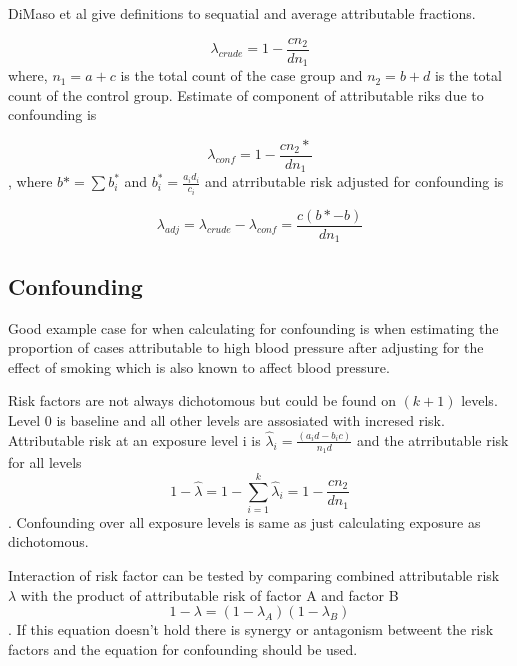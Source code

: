 DiMaso et al give definitions to sequatial and average attributable fractions. 


\begin{equation}
    \lambda_{crude} = 1 - \frac{cn_2}{dn_1}
\end{equation} where, $n_1 = a+c$ is the total count of the case group and $n_2 =  b + d $ is the total count of the control group. Estimate of component of attributable riks due to confounding is\cite{Walter1976TheEA}

\begin{equation}
    \lambda_{conf} = 1 - \frac{cn_2*}{dn_1}
\end{equation}, where $b* = \sum b_i^*$ and $b_i^* = \frac{a_id_i}{c_i}$
and atrributable risk adjusted for confounding is\cite{Walter1976TheEA}

\begin{equation}
    \lambda_{adj} = \lambda_{crude} - \lambda_{conf} = \frac{c(b*-b)}{dn_1}
\end{equation}\cite{Walter1976TheEA}

\subsection{Confounding}
Good example case for when calculating for confounding is when estimating the proportion of cases attributable to high blood pressure after adjusting for the effect of smoking which is also known to affect blood pressure.\cite{Walter1976TheEA}

Risk factors are not always dichotomous but could be found on $(k + 1)$ levels. Level 0 is baseline and all other levels are assosiated with incresed risk. Attributable risk at an exposure level i is $\hat{\lambda}_i = \frac{(a_id - b_ic)}{n_1d}$ and the atrributable risk for all levels
\begin{equation}
    1 - \hat{\lambda} = 1 - \sum_{i=1}^{k} \hat{\lambda}_i = 1 - \frac{cn_2}{dn_1}
\end{equation}. Confounding over all exposure levels is same as just calculating exposure as dichotomous.\cite{Walter1976TheEA}

Interaction of risk factor can be tested by comparing combined attributable risk $\lambda$ with the product of attributable risk of factor A and factor B
\begin{equation}
    1 - \lambda = (1 - \lambda_{A})(1 - \lambda_{B})
\end{equation}. If this equation doesn't hold there is synergy or antagonism betweent the risk factors and the equation for confounding should be used.
\cite{Walter1976TheEA}

